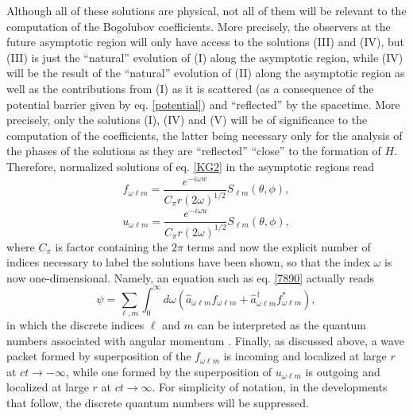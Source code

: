 \documentclass[
12pt,		%
openright,	%
twoside,  %
a4paper,			%
chapter=TITLE,		%
english,			%
french,				%
spanish,			%
brazil				%
]{USPSC-classe/USPSC}
\begin{document}
Although all of these solutions are physical, not all of them will be relevant to the computation of the Bogolubov coefficients. More precisely, the observers at the future asymptotic region will only have access to the solutions (III) and (IV), but (III) is just the ``natural'' evolution of (I) along the asymptotic region, while (IV) will be the result of the ``natural'' evolution of (II) along the asymptotic region as well as the contributions from (I) as it is scattered  (as a consequence of the potential barrier given by eq. \ref{potential}) and ``reflected'' by the spacetime. More precisely, only the solutions (I), (IV) and (V) will be of significance to the computation of the coefficients, the latter being necessary only for the analysis of the phases of the solutions as they are ``reflected'' ``close'' to the formation of $H$. Therefore, normalized solutions \cite{Parker2009} of eq. \ref{KG2} in the asymptotic regions read
\begin{equation}\label{wave-}
    f_{\omega\ell m}=\frac{e^{-i\omega w}}{C_{\pi}r(2\omega)^{1/2}}S_{\ell m}(\theta,\phi),
\end{equation}
\begin{equation}\label{wave+}
    u_{\omega\ell m}=\frac{e^{-i\omega u}}{C_{\pi}r(2\omega)^{1/2}}S_{\ell m}(\theta,\phi),
\end{equation}
where $C_{\pi}$ is factor containing the $2\pi$ terms and now the explicit number of indices necessary to label the solutions have been shown, so that the index $\omega$ is now one-dimensional. Namely, an equation such as eq. \ref{7890} actually reads
\begin{equation}
    \hat{\psi}=\sum_{\ell, m}\int_{0}^{\infty} d\omega(\hat{a}_{\omega\ell m}f_{\omega\ell m}+\hat{a}^{\dag}_{\omega\ell m}f_{\omega\ell m}^*),
\end{equation}
in which the discrete indices $\ell$ and $m$ can be interpreted as the quantum numbers associated with angular momentum \cite{Parker2009}. Finally, as discussed above, a wave packet formed by superposition of the $f_{\omega\ell m}$ is incoming and localized at large $r$ at $ct\to-\infty$, while one formed by the superposition of $u_{\omega\ell m}$ is outgoing and localized at large $r$ at $ct\to\infty$. For simplicity of notation, in the developments that follow, the discrete quantum numbers will be suppressed. 
\end{document}
